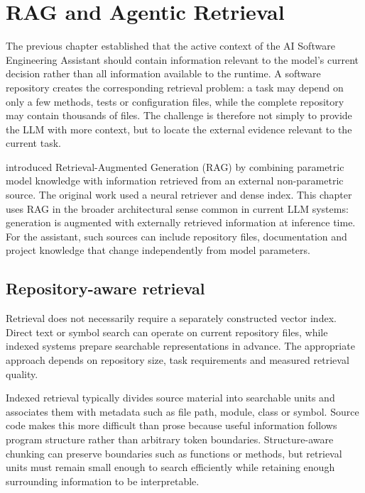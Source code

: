 \chapter{RAG and Agentic Retrieval}
\label{chap:retrieval}

The previous chapter established that the active context of the AI Software Engineering Assistant should contain information relevant to the model’s current decision rather than all information available to the runtime. A software repository creates the corresponding retrieval problem: a task may depend on only a few methods, tests or configuration files, while the complete repository may contain thousands of files. The challenge is therefore not simply to provide the LLM with more context, but to locate the external evidence relevant to the current task.

\textcite{lewis2020rag} introduced Retrieval-Augmented Generation (RAG) by combining parametric model knowledge with information retrieved from an external non-parametric source. The original work used a neural retriever and dense index. This chapter uses RAG in the broader architectural sense common in current LLM systems: generation is augmented with externally retrieved information at inference time. For the assistant, such sources can include repository files, documentation and project knowledge that change independently from model parameters.

\section{Repository-aware retrieval}
\label{sec:repository-retrieval}

Retrieval does not necessarily require a separately constructed vector index. Direct text or symbol search can operate on current repository files, while indexed systems prepare searchable representations in advance. The appropriate approach depends on repository size, task requirements and measured retrieval quality.

Indexed retrieval typically divides source material into searchable units and associates them with metadata such as file path, module, class or symbol. Source code makes this more difficult than prose because useful information follows program structure rather than arbitrary token boundaries. Structure-aware chunking can preserve boundaries such as functions or methods, but retrieval units must remain small enough to search efficiently while retaining enough surrounding information to be interpretable.

